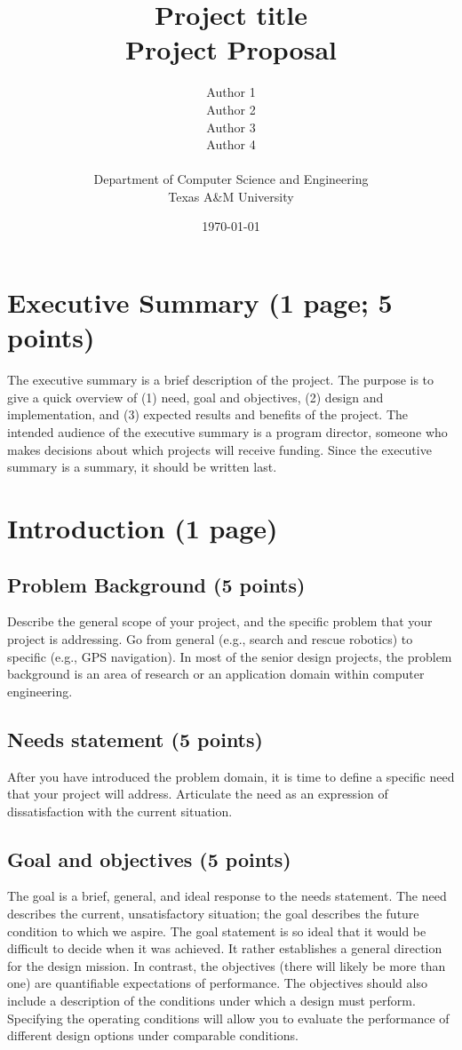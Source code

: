 \documentclass[letterpaper,12pt]{article}
\title{Project title\\{\Large Project Proposal}}
\author{\begin{Large} Author 1\\Author 2\\Author 3\\Author 4\\ \end{Large} Department of Computer Science and Engineering\\Texas A\&M University\\[4ex]}
\date{\today}
\begin{document}
\maketitle
\thispagestyle{fancy}
\newpage

\tableofcontents
\newpage

\section*{Executive Summary (1 page; 5 points)}
The executive summary is a brief description of the project. The
purpose is to give a quick overview of (1) need, goal and objectives,
(2) design and implementation, and (3) expected results and benefits
of the project. The intended audience of the executive summary is a
program director, someone who makes decisions about which projects will
receive funding. Since the executive summary is a summary, it should be
written last.

\section{Introduction (1 page)}
\subsection{Problem Background (5 points)}
Describe the general scope of your project, and the specific problem
that your project is addressing. Go from general (e.g., search and
rescue robotics) to specific (e.g., GPS navigation). In most of the
senior design projects, the problem background is an area of research
or an application domain within computer engineering.

\subsection{Needs statement (5 points)} After you have introduced the
problem domain, it is time to define a specific need that your project
will address. Articulate the need as an expression of dissatisfaction
with the current situation.

\subsection{Goal and objectives (5 points)}

The goal is a brief, general, and ideal response to the needs
statement. The need describes the current, unsatisfactory situation;
the goal describes the future condition to which we aspire. The goal
statement is so ideal that it would be difficult to decide when it
was achieved. It rather establishes a general direction for the design
mission. In contrast, the objectives (there will likely be more than
one) are quantifiable expectations of performance. The objectives should
also include a description of the conditions under which a design must
perform. Specifying the operating conditions will allow you to evaluate
the performance of different design options under comparable conditions.
\end{document}

